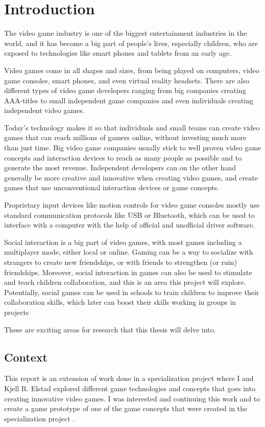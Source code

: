 \chapter{Introduction}
The video game industry is one of the biggest entertainment industries in the world, and it has become a big part of people's lives, especially children, who are exposed to technologies like smart phones and tablets from an early age. 

Video games come in all shapes and sizes, from being played on computers, video game consoles, smart phones, and even virtual reality headsets. There are also different types of video game developers ranging from big companies creating AAA-titles to small independent game companies and even individuals creating independent video games. 

Today's technology makes it so that individuals and small teams can create video games that can reach millions of gamers online, without investing much more than just time. Big video game companies usually stick to well proven video game concepts and interaction devices to reach as many people as possible and to generate the most revenue. Independent developers can on the other hand generally be more creative and innovative when creating video games, and create games that use unconventional interaction devices or game concepts.

Proprietary input devices like motion controls for video game consoles mostly use standard communication protocols like USB or Bluetooth, which can be used to interface with a computer with the help of official and unofficial driver software. 

Social interaction is a big part of video games, with most games including a multiplayer mode, either local or online. Gaming can be a way to socialize with strangers to create new friendships, or with friends to strengthen (or ruin) friendships. Moreover, social interaction in games can also be used to stimulate and teach children collaboration, and this is an area this project will explore. Potentially, social games can be used in schools to train children to improve their collaboration skills, which later can boost their skills working in groups in projects

These are exciting areas for research that this thesis will delve into.

\section{Context}
This report is an extension of work done in a specialization project where I and Kjell R. Elstad explored different game technologies and concepts that goes into creating innovative video games. I was interested and continuing this work and to create a game prototype of one of the game concepts that were created in the specialization project \cite{hovind2015alternative}.

